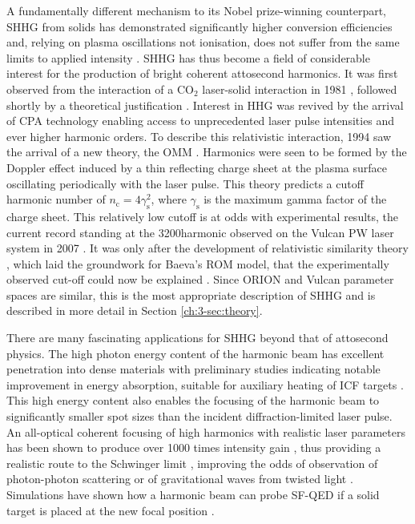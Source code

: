 A fundamentally different mechanism to its Nobel prize-winning counterpart, SHHG from solids has demonstrated significantly higher conversion efficiencies and, relying on plasma oscillations not ionisation, does not suffer from the same limits to applied intensity \cite{teubnerHighorderHarmonicsLaserirradiated2009}. SHHG has thus become a field of considerable interest for the production of bright coherent attosecond harmonics. It was first observed from the interaction of a CO$_2$ laser-solid interaction in 1981 \cite{carmanVisibleHarmonicEmission1981}, followed shortly by a theoretical justification \cite{bezzeridesPlasmaMechanismUltraviolet1982}. Interest in HHG was revived by the arrival of CPA technology enabling access to unprecedented laser pulse intensities and ever higher harmonic orders. To describe this relativistic interaction, 1994 saw the arrival of a new theory, the \ac{OMM} \cite{bulanovInteractionUltrashortRelativistically1994}. Harmonics were seen to be formed by the Doppler effect induced by a thin reflecting charge sheet at the plasma surface oscillating periodically with the laser pulse. This theory predicts a cutoff harmonic number of $n_\mathrm{c} = 4\gamma_\mathrm{s}^2 $, where $\gamma_\mathrm{s}$ is the maximum gamma factor of the charge sheet. This relatively low cutoff is at odds with experimental results, the current record standing at the 3200\th harmonic observed on the Vulcan PW laser system in 2007 \cite{dromeyBrightMultikeVHarmonic2007}. It was only after the development of relativistic similarity theory \cite{gordienkoScalingsUltrarelativisticLaser2005}, which laid the groundwork for Baeva's ROM model, that the experimentally observed cut-off could now be explained \cite{baevaTheoryHighorderHarmonic2006}. Since ORION and Vulcan parameter spaces are similar, this is the most appropriate description of SHHG and is described in more detail in Section \ref{ch:3-sec:theory}.

There are many fascinating applications for SHHG beyond that of attosecond physics. The high photon energy content of the harmonic beam has excellent penetration into dense materials with preliminary studies indicating notable improvement in energy absorption, suitable for auxiliary heating of ICF targets \cite{paddockEnergyGainWettedfoam2024}. This high energy content also enables the focusing of the harmonic beam to significantly smaller spot sizes than the incident diffraction-limited laser pulse. An all-optical coherent focusing of high harmonics with realistic laser parameters has been shown to produce over 1000 times intensity gain \cite{vincentiAchievingExtremeLight2019}, thus providing a realistic route to the Schwinger limit \cite{quereReflectingPetawattLasers2021}, improving the odds of observation of photon-photon scattering \cite{aboushelbayaOrbitalAngularMomentum2019} or of gravitational waves from twisted light \cite{atongaGravitationalWavesHighpower2023}. Simulations have shown how a harmonic beam can probe \ac{SF-QED} if a solid target is placed at the new focal position \cite{fedeliProbingStrongfieldQED2020}.

